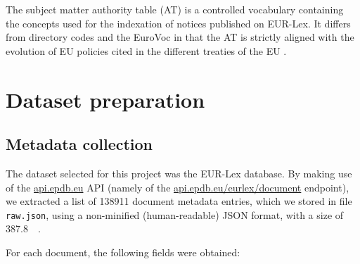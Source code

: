 \documentclass[sigconf, authorversion]{acmart}
\begin{document}
The subject matter authority table (AT) is a controlled vocabulary containing the concepts used for the indexation of notices published on EUR-Lex. It differs from directory codes and the EuroVoc in that the AT is strictly aligned with the evolution of EU policies cited in the different treaties of the EU \cite{subject-matter-at}.

\section{Dataset preparation}


\subsection{Metadata collection} \label{ssec:metadata-collection}

The dataset selected for this project was the EUR-Lex database. By making use of the \url{api.epdb.eu} API (namely of the \url{api.epdb.eu/eurlex/document} endpoint), we extracted a list of 138911 document metadata entries, which we stored in file \texttt{raw.json}, using a non-minified (human-readable) JSON format, with a size of \SI{387.8}{\mega\byte}.

For each document, the following fields were obtained:
\end{document}
